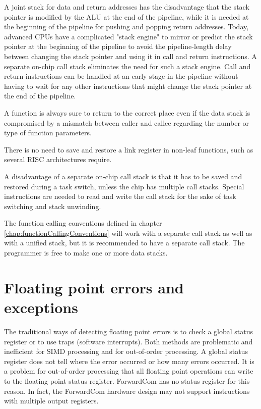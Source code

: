 \documentclass[forwardcom.tex]{subfiles}
\begin{document}
A joint stack for data and return addresses has the disadvantage that the stack pointer is modified by the ALU at the end of the pipeline, while it is needed at the beginning of the pipeline for pushing and popping return addresses. Today, advanced CPUs have a complicated "stack engine" to mirror or predict the stack pointer at the beginning of the pipeline to avoid the pipeline-length delay between changing the stack pointer and using it in call and return instructions. A separate on-chip call stack eliminates the need for such a stack engine. Call and return instructions can be handled at an early stage in the pipeline without having to wait for any other instructions that might change the stack pointer at the end of the pipeline.
\vv

A function is always sure to return to the correct place even if the data stack is compromised by a mismatch between caller and callee regarding the number or type of function parameters.
\vv

There is no need to save and restore a link register in non-leaf functions, such as several RISC architectures require.
\vv

A disadvantage of a separate on-chip call stack is that it has to be saved and restored during a task switch, unless the chip has multiple call stacks. Special instructions are needed to read and write the call stack for the sake of task switching and stack unwinding.
\vv

The function calling conventions defined in chapter \ref{chap:functionCallingConventions} will 
work with a separate call stack as well as with a unified stack, but it is recommended to have a separate call stack. The programmer is free to make one or more data stacks.
\vv


\section{Floating point errors and exceptions}
\label{FloatingPointErrors}
The traditional ways of detecting floating point errors is to check a global status register or to use traps (software interrupts). Both methods are problematic and inefficient for SIMD processing and for out-of-order processing. 
A global status register does not tell where the error occurred or how many errors occurred. It is a problem for out-of-order processing that all floating point operations can write to the floating point status register. 
ForwardCom has no status register for this reason. In fact, the ForwardCom hardware design may not support instructions with multiple output registers. 
\vv
\end{document}
